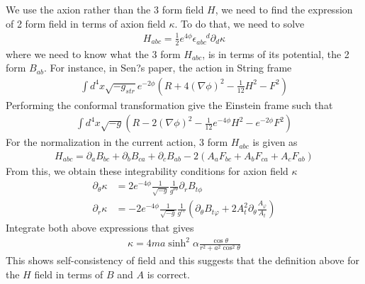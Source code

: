 \documentclass[%
 reprint,
 amsmath,amssymb,
 aps,
]{revtex4-1}
\begin{document}
We use the axion rather than the 3 form field $H$, we need to find the expression of 2 form field in terms of axion field $\kappa$. To do that, we need to solve
\begin{align}
H_{abc} = \frac{1}{2} e^{4 \phi} \epsilon_{abc}^{\; \; \; \; \; d} \partial_d \kappa
\end{align}
where we need to know what the 3 form $H_{abc}$, is in terms of its potential, the 2 form $B_{ab}$.  For instance, in Sen?s paper, the action in String frame
\begin{align}
\int d^4 x \sqrt{-g_{str}} e^{-2 \phi} \left(R+4 (\nabla \phi)^2 -\frac{1}{12} H^2 - F^2 \right)
\end{align}
Performing the conformal transformation give the Einstein frame such that
\begin{align}
\int d^4 x \sqrt{-g}\left(R - 2 (\nabla \phi)^2 -\frac{1}{12} e^{-4 \phi} H^2 - e^{-2\phi}F^2 \right)
\end{align}
For the normalization in the current action, 3 form $H_{abc}$ is given as
\begin{align}
H_{abc} = \partial_a B_{bc} + \partial_b B_{ca} + \partial_c B_{ab} - 2( A_a F_{bc} + A_b F_{ca} + A_c F_{ab} )
\end{align}
From this, we obtain these integrability conditions for axion field $\kappa$ 
\begin{align}
\partial_\theta \kappa &= 2 e^{-4 \phi} \frac{1}{\sqrt{-g}} \frac{1}{g^{\theta \theta}} \partial_r B_{t \phi} \\
\partial_r \kappa &= - 2 e^{-4 \phi} \frac{1}{\sqrt{-g}} \frac{1}{g^{rr}} \left( \partial_\theta B_{t \varphi} + 2 A_t^2 \partial_\theta \frac{A_\varphi}{A_t} \right)
\end{align}
Integrate both above expressions that gives
\begin{align}
\kappa = 4 m a \sinh^2 \alpha \frac{\cos \theta}{r^2 + a^2 \cos^2 \theta}
\end{align}
This shows self-consistency of field and this suggests that the definition above for the $H$ field in terms of $B$ and $A$ is correct.
\end{document}
